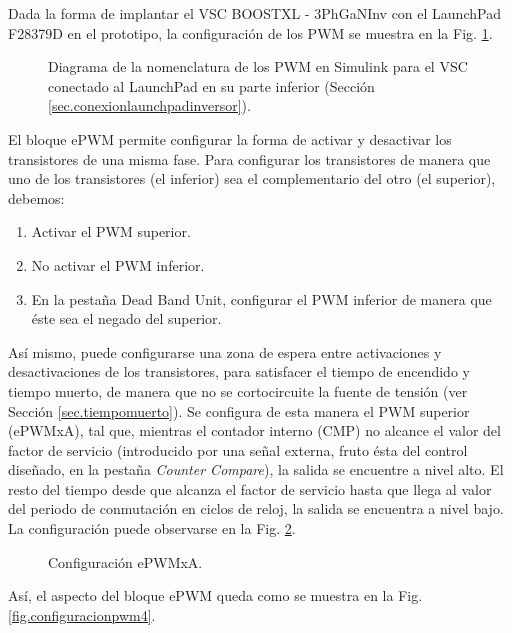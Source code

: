 \documentclass{report}
\begin{document}
Dada la forma de implantar el VSC BOOSTXL - 3PhGaNInv con el LaunchPad F28379D en el prototipo, la configuración de los PWM se muestra en la Fig. \ref{fig.pwmenprototipo}.


\begin{figure}[!h]
    \begin{center}
    \caption{Diagrama de la nomenclatura de los PWM en Simulink para el VSC conectado al LaunchPad en su parte inferior (Sección \ref{sec.conexionlaunchpadinversor}).}
    \label{fig.pwmenprototipo}
    \end{center}
\end{figure}

El bloque ePWM permite configurar la forma de activar y desactivar los transistores de una misma fase. Para configurar los transistores de manera que uno de los transistores (el inferior) sea el complementario del otro (el superior), debemos:

\begin{enumerate}
    \item Activar el PWM superior.
    \item No activar el PWM inferior.
    \item En la pestaña Dead Band Unit, configurar el PWM inferior de manera que éste sea el negado del superior.
\end{enumerate}

Así mismo, puede configurarse una zona de espera entre activaciones y desactivaciones de los transistores, para satisfacer el tiempo de encendido y tiempo muerto, de manera que no se cortocircuite la fuente de tensión (ver Sección \ref{sec.tiempomuerto}). Se configura de esta manera el PWM superior (ePWMxA), tal que, mientras el contador interno (CMP) no alcance el valor del factor de servicio (introducido por una señal externa, fruto ésta del control diseñado, en la pestaña \textit{Counter Compare}), la salida se encuentre a nivel alto. El resto del tiempo desde que alcanza el factor de servicio hasta que llega al valor del periodo de conmutación en ciclos de reloj, la salida se encuentra a nivel bajo. La configuración puede observarse en la Fig. \ref{fig.configuracionpwm2_1}.

\begin{figure}[!h]
    \begin{center}
    \caption{Configuración ePWMxA. }
    \label{fig.configuracionpwm2_1} 
    \end{center}
\end{figure}
Así, el aspecto del bloque ePWM queda como se muestra en la Fig. \ref{fig.configuracionpwm4}.
\end{document}
